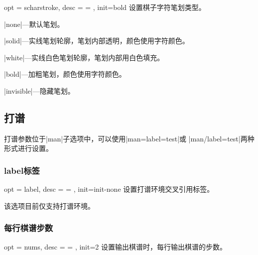 \documentclass[full]{l3doc}
\begin{document}
\begin{documentation}
\begin{option}{ opt = scharstroke, desc = {= }, init=bold }
  设置棋子字符笔划类型。
\end{option}

  \begin{Description}[a]
    \item |none|---默认笔划。
    \item |solid|---实线笔划轮廓，笔划内部透明，颜色使用字符颜色。
    \item |white|---实线白色笔划轮廓，笔划内部用白色填充。
    \item |bold|---加粗笔划，颜色使用字符颜色。
    \item |invisible|---隐藏笔划。
  \end{Description}

\begin{SideBySideExample}[frame=single,numbers=left,
                xrightmargin=.58\linewidth,gobble=2]
  \centering
  \cchessboard[charstroke=white,
    redupper=red,blkupper=black]
\end{SideBySideExample}

\bigskip

\subsection{打谱}

打谱参数位于|man|子选项中，可以使用|man={label=test}|或
|man/label=test|两种形式进行设置。

\subsubsection{label标签}

\begin{option}{ opt = label, desc = {= }, init=init-none }
  设置打谱环境交叉引用标签。
\end{option}

  该选项目前仅支持打谱环境。

\subsubsection{每行棋谱步数}

\begin{option}{ opt = nums, desc = {= }, init=2 }
  设置输出棋谱时，每行输出棋谱的步数。
\end{option}


\end{documentation}
\end{document}
